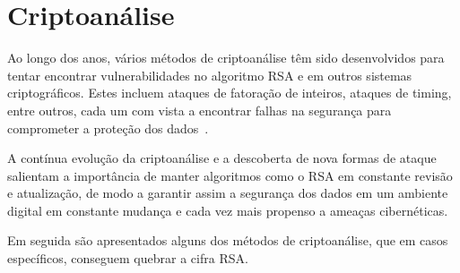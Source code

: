\section{Criptoanálise}
\label{sec:criptoanalise}

Ao longo dos anos, vários métodos de criptoanálise têm sido desenvolvidos para tentar encontrar vulnerabilidades no algoritmo RSA e em outros sistemas criptográficos. Estes incluem ataques de fatoração de inteiros, ataques de timing, entre outros, cada um com vista a encontrar falhas na segurança para comprometer a proteção dos dados~\cite{Quaresma2009a,Coutinho2005}.

A contínua evolução da criptoanálise e a descoberta de nova formas de ataque salientam a importância de manter algoritmos como o RSA em constante revisão e atualização, de modo a garantir assim a segurança dos dados em um ambiente digital em constante mudança e cada vez mais propenso a ameaças cibernéticas.

Em seguida são apresentados alguns dos métodos de criptoanálise,  que em casos específicos, conseguem quebrar a cifra RSA.

\begin{comment}
\textbf{Expoente de encriptação}

De maneira a aumentar a eficiência da encriptação é importante selecionar um expoente d encriptação $e$ pequeno
$$c=m^e(mod \; n)$$
Mas $e$ não poder ser muito pequeno. Com efeito para $e=3$ suponhamos que estamos a enviar a mensagem $m$ para três diferentes entidades com módulos públicos de $n_1, \;n_2 \; e n_3$, vai se enviar $c_i=m^3 mod\;n_i$ para $1\le\le 3$.\\
Consideremos que $n_1,n_2 e n_3$ são primos dois a dois, é possível usar os textos encriptados para descobrir a solução $x$, onde $0 \le x \le n_1n_2n_3$, das três congruências anteriores vamos obter 
\begin{equation}
\left\{ \begin{aligned} 
  x &\equiv c_1 (mod \;n_1)\\
  x &\equiv c_2 (mod \;n_2)\\
  x &\equiv c_3 (mod\;n_3)\\
\end{aligned} \right.
\end{equation}
Uma vez que $n^3 < n_1n_2n_3$, pelo Teorema Chinês dos Restos, tem-se que $x=m^3$. Logo fazendo a raiz cúbica de x consegue-se recuperar o texto original.[4]
\end{comment}

